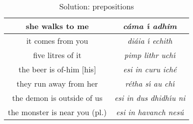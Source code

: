 \begin{table}[H]
{\begin{tabular}{|c|>{\itshape}c|}
  \midrule
  she walks to me & c\'{a}ma \'{\i} adhim\\
  \midrule
  it comes from you & di\'{a}ia \'{\i} echith\\
  \midrule
  five litres of it & pimp lithr uch\'{\i}\\
  \midrule
  the beer is of-him $[$his$]$ & esi in curu ich\'{e}\\
  \midrule
  they run away from her & r\'{e}tha s\'{\i} au ch\'{\i}\\
  \midrule
  the demon is outside of us & esi in dus dhidh\'{\i}u ni\\
  \midrule
  the monster is near you (pl.) & esi in havanch nes\'{u}\\
  \bottomrule
  \end{tabular}
}
\label{solution_prepositions}
\caption{Solution: prepositions}
\end{table}

